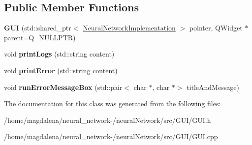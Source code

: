 \subsection*{Public Member Functions}
\begin{DoxyCompactItemize}
\item 
\mbox{\label{classGUI_a15f66286a4f60a1af759ce6638a14c8a}} 
{\bfseries G\+UI} (std\+::shared\+\_\+ptr$<$ \hyperlink{classNeuralNetworkImplementation}{Neural\+Network\+Implementation} $>$ pointer, Q\+Widget $\ast$parent=Q\+\_\+\+N\+U\+L\+L\+P\+TR)
\item 
\mbox{\label{classGUI_a12302b586c0514055a96eb474ea7c50a}} 
void {\bfseries print\+Logs} (std\+::string content)
\item 
\mbox{\label{classGUI_a28c696839af97cd0ad977a8f1516ca89}} 
void {\bfseries print\+Error} (std\+::string content)
\item 
\mbox{\label{classGUI_aa7df52281f532932c48fe873d34c3203}} 
void {\bfseries run\+Error\+Message\+Box} (std\+::pair$<$ char $\ast$, char $\ast$$>$ title\+And\+Message)
\end{DoxyCompactItemize}


The documentation for this class was generated from the following files\+:\begin{DoxyCompactItemize}
\item 
/home/magdalena/neural\+\_\+network-\//neural\+Network/src/\+G\+U\+I/G\+U\+I.\+h\item 
/home/magdalena/neural\+\_\+network-\//neural\+Network/src/\+G\+U\+I/G\+U\+I.\+cpp\end{DoxyCompactItemize}
